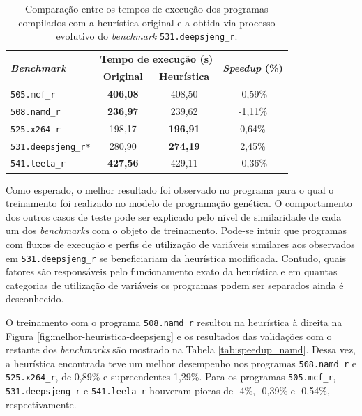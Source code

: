 \documentclass[
	12pt,				%
	openright,			%
	twoside,			%
	a4paper,			%
	tcc,			%
	]{ABNT-DC-UEL}
\begin{document}
\begin{table}[htb]
    \centering
    \begin{tabular}{lccc}
        \hline
        \multirow{2}{*}{\textbf{\textit{Benchmark}}} & \multicolumn{2}{c}{\textbf{Tempo de execução (s)}}  & \multirow{2}{*}{\textbf{\textit{Speedup} (\%)}} \\\cline{2-3}
                         & \textbf{Original}  & \textbf{Heurística} &  \\
        \hline
        \texttt{505.mcf\_r}         & \textbf{406,08}   & 408,50          & -0,59\% \\
        \texttt{508.namd\_r}        & \textbf{236,97}   & 239,62          & -1,11\% \\
        \texttt{525.x264\_r}        & 198,17            & \textbf{196,91} & 0,64\%  \\
        \texttt{531.deepsjeng\_r*}  & 280,90            & \textbf{274,19} & 2,45\%  \\
        \texttt{541.leela\_r}	    & \textbf{427,56}   & 429,11          & -0,36\% \\\hline
    \end{tabular}
    \caption{Comparação entre os tempos de execução dos programas compilados com a heurística original e a obtida via processo evolutivo do \textit{benchmark} \texttt{531.deepsjeng\_r}.}
    \label{tab:speedup_deepsjeng}
\end{table}

Como esperado, o melhor resultado foi observado no programa para o qual o treinamento foi realizado no modelo de programação genética. O comportamento dos outros casos de teste pode ser explicado pelo nível de similaridade de cada um dos \textit{benchmarks} com o objeto de treinamento. Pode-se intuir que programas com fluxos de execução e perfis de utilização de variáveis similares aos observados em \texttt{531.deepsjeng\_r} se beneficiariam da heurística modificada. Contudo, quais fatores são responsáveis pelo funcionamento exato da heurística e em quantas categorias de utilização de variáveis os programas podem ser separados ainda é desconhecido.

O treinamento com o programa \texttt{508.namd\_r} resultou na heurística à direita na Figura \ref{fig:melhor-heuristica-deepsjeng} e os resultados das validações com o restante dos \textit{benchmarks} são mostrado na Tabela \ref{tab:speedup_namd}. Dessa vez, a heurística encontrada teve um melhor desempenho nos programas \texttt{508.namd\_r} e \texttt{525.x264\_r}, de 0,89\% e supreendentes 1,29\%. Para os programas \texttt{505.mcf\_r}, \texttt{531.deepsjeng\_r} e \texttt{541.leela\_r} houveram pioras de -4\%, -0,39\% e -0,54\%, respectivamente. 
\end{document}
